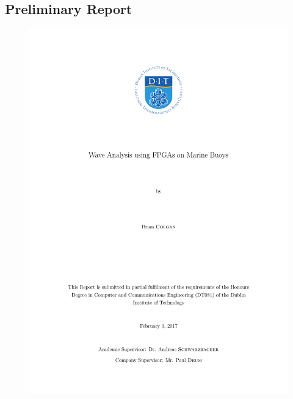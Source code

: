 \documentclass[12pt,a4paper]{report} %
\begin{document}
\begin{appendices}
\chapter{Preliminary Report}
\begin{figure}[h]
\centerline{\includegraphics[page=1,scale=0.55]{diagrams/Prelim.pdf}}
\end{figure}

\end{appendices}
\end{document}

